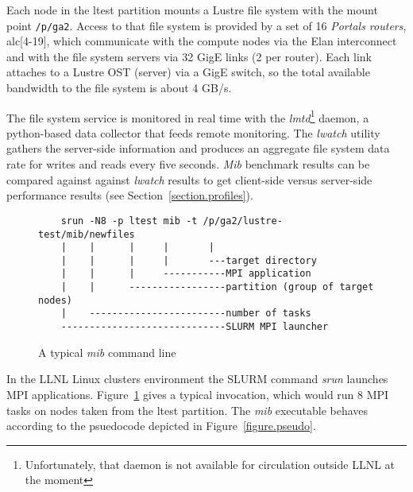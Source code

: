 \documentclass{article}
\begin{document}
Each node in the ltest partition mounts a Lustre file system with the
mount point \verb+/p/ga2+.  Access to that file system is provided by
a set of 16 {\em Portals routers}, alc[4-19], which communicate with
the compute nodes via the Elan interconnect and with the file system
servers via 32 GigE links (2 per router).  Each link attaches to a
Lustre OST (server) via a GigE switch, so the total available
bandwidth to the file system is about 4 GB/s.  

The file system service is monitored in real time with the {\em
  lmtd}\footnote{Unfortunately, that daemon is not available for
  circulation outside LLNL at the moment} daemon, a python-based data
  collector that feeds remote monitoring.  The {\em lwatch} utility
  gathers the server-side information and produces an aggregate file
  system data rate for writes and reads every five seconds.  {\em Mib}
  benchmark results can be compared against against {\em lwatch}
  results to get client-side versus server-side performance results (see Section~\ref{section.profiles}).   

\begin{figure}
  \begin{verbatim}
    srun -N8 -p ltest mib -t /p/ga2/lustre-test/mib/newfiles
    |    |      |     |       |
    |    |      |     |       ---target directory
    |    |      |     -----------MPI application
    |    |      -----------------partition (group of target nodes)
    |    ------------------------number of tasks
    -----------------------------SLURM MPI launcher
  \end{verbatim}
\caption{A typical {\em mib} command line}
\label{figure.typical}
\end{figure}

In the LLNL Linux clusters environment the SLURM command {\em srun}
launches MPI applications.  Figure~\ref{figure.typical} gives a
typical invocation, which would run 8 MPI tasks on nodes taken from
the ltest partition.  The {\em mib} executable behaves according to
the psuedocode depicted in Figure~\ref{figure.pseudo}.
\end{document}
